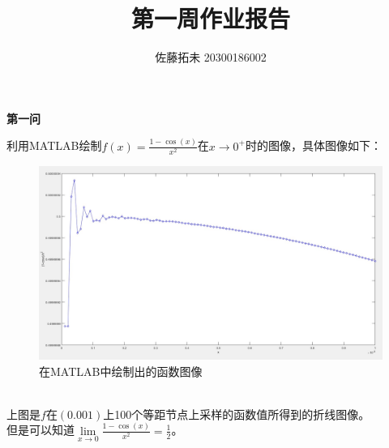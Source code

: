 \documentclass[12pt]{article}
\title{第一周作业报告}
\author{佐藤拓未 20300186002}
\date{}
\begin{document}
	\maketitle
    \begin{center}
		\textbf{第一问}
    \end{center}
    利用MATLAB绘制$f(x)=\frac{1-\cos(x)}{x^2}$在$x\rightarrow0^+$时的图像，具体图像如下：
    \begin{figure}[h]
    	\centering
    	\includegraphics[width=1\textwidth]{图1}
    	\caption{在MATLAB中绘制出的函数图像}
    \end{figure}
  	\\
  	上图是$f$在$(0.001)$上100个等距节点上采样的函数值所得到的折线图像。
	\\
	但是可以知道$\lim\limits_{x\to0}\frac{1-\cos(x)}{x^2}=\frac{1}{2}$。
    \\
    \\
    
\end{document}
